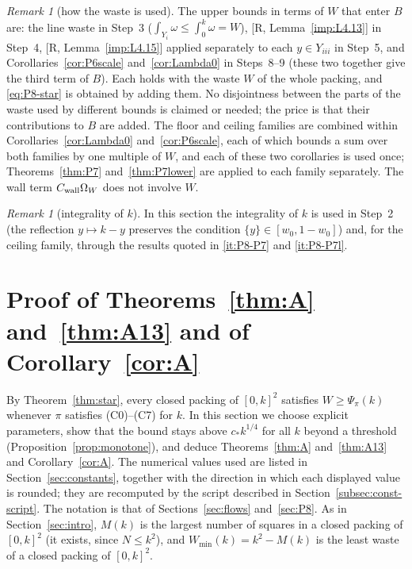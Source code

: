 \documentclass[11pt]{amsart}
\newcommand{\frc}[1]{\{#1\}}
\theoremstyle{definition}
\theoremstyle{remark}
\newtheorem{remark}[theorem]{Remark}
\numberwithin{equation}{section}
\begin{document}
\begin{remark}[how the waste is used]\label{rem:P8-bookkeeping}
The upper bounds in terms of $W$ that enter $B$ are: the line waste in Step~3 ($\int_{Y_i}\omega\le\int_0^k\omega=W$),
[R, Lemma~\ref{imp:L4.13}] in Step~4, [R, Lemma~\ref{imp:L4.15}] applied separately to each $y\in Y_{iii}$ in Step~5,
and Corollaries~\ref{cor:P6scale} and~\ref{cor:Lambda0} in Steps~8--9 (these two together give the third term of $B$).
Each holds with the waste $W$ of the whole packing, and \eqref{eq:P8-star} is obtained by adding them. No disjointness
between the parts of the waste used by different bounds is claimed or needed; the price is that their contributions to
$B$ are added. The floor and ceiling families are combined within Corollaries~\ref{cor:Lambda0} and~\ref{cor:P6scale},
each of which bounds a sum over both families by one multiple of $W$, and each of these two corollaries is used once;
Theorems~\ref{thm:P7} and~\ref{thm:P7lower} are applied to each family separately. The wall term $C_{\rm wall}\Omega_W$
does not involve $W$.
\end{remark}

\begin{remark}[integrality of $k$]\label{rem:P8-integer}
In this section the integrality of $k$ is used in Step~2 (the reflection $y\mapsto k-y$ preserves the condition
$\frc{y}\in[w_0,1-w_0]$) and, for the ceiling family, through the results quoted in \ref{it:P8-P7} and \ref{it:P8-P7l}.
\end{remark}

\section{Proof of \texorpdfstring{Theorems~\ref{thm:A} and~\ref{thm:A13} and of Corollary~\ref{cor:A}}{Theorems A and A13 and of Corollary A}}\label{sec:assembly}

By Theorem~\ref{thm:star}, every closed packing of $[0,k]^2$ satisfies $W\ge\Psi_\pi(k)$ whenever $\pi$ satisfies
(C0)--(C7) for $k$. In this section we choose explicit parameters, show that the bound stays above $c_*k^{1/4}$ for
all $k$ beyond a threshold (Proposition~\ref{prop:monotone}), and deduce Theorems~\ref{thm:A} and~\ref{thm:A13} and
Corollary~\ref{cor:A}. The numerical values used are listed in Section~\ref{sec:constants}, together with the direction
in which each displayed value is rounded; they are recomputed by the script described in
Section~\ref{subsec:const-script}. The notation is that of Sections~\ref{sec:flows} and~\ref{sec:P8}. As in
Section~\ref{sec:intro}, $M(k)$ is the largest number of squares in a closed packing of $[0,k]^2$ (it exists, since
$N\le k^2$), and $W_{\min}(k)=k^2-M(k)$ is the least waste of a closed packing of $[0,k]^2$.
\end{document}
